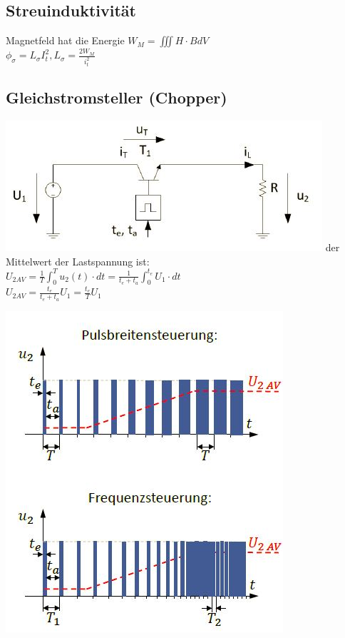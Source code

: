 \subsection{Streuinduktivität}
Magnetfeld hat die Energie $W_{M} = \iiint H \cdot B dV $ \\
$\phi_{\sigma} = L_{\sigma}I_{t}^2, L_{\sigma}= \frac{2W_{M}}{i_{t}^2}$

\subsection{Gleichstromsteller (Chopper)}


  \begin{minipage}{0.5 \linewidth}
    \includegraphics[width = \linewidth]{./pictures/gleichstromschalter3}
    der Mittelwert der Lastspannung ist:\\
    $U_{2 AV} = \frac{1}{T}\int_{0}^{T}u_{2}(t)\cdot dt= \frac{1}{t_{e}+t_{a}}\int_{0}^{t_{e}}U_{1}\cdot dt$\\
    $U_{2 AV} = \frac{t_{e}}{t_{e}+t_{a}}U_{1}= \frac{t_{e}}{T}U_{1}$
  \end{minipage}
  \hfill
  \begin{minipage}{0.5 \linewidth}
    \includegraphics[width = \linewidth]{./pictures/gleichstromschalter4}
  \end{minipage}
